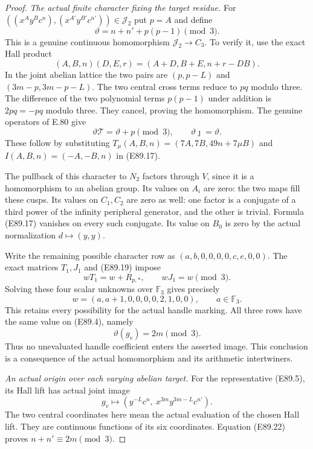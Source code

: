 \begin{proof}
\emph{The actual finite character fixing the target residue.}
For $((x^Ay^Bc^n),(x^{A'}y^{B'}c^{n'}))\in\mathcal J_2$
put $p=A$ and define
\[
          \vartheta=n+n'+p(p-1)\pmod3.
 \tag{E89.17}
\]
This is a genuine continuous homomorphism
$\mathcal J_2\to C_3$. To verify it, use
the exact Hall product
\[
  (A,B,n)(D,E,r)=(A+D,B+E,n+r-DB).
 \tag{E89.18}
\]
In the joint abelian lattice the two pairs
are $(p,p-L)$ and $(3m-p,3m-p-L)$.
The two central cross terms reduce to
$pq$ modulo three. The difference of the
two polynomial terms $p(p-1)$ under
addition is $2pq=-pq$ modulo three.
They cancel, proving the homomorphism.
The genuine operators of E.80 give
\[
    \vartheta\mathcal T=\vartheta+p\pmod3,
             \qquad\vartheta\jmath=\vartheta.
 \tag{E89.19}
\]
These follow by substituting
$T_\mu(A,B,n)=(7A,7B,49n+7\mu B)$
and $I(A,B,n)=(-A,-B,n)$ in (E89.17).

The pullback of this character to $N_2$
factors through $V$, since it is a homomorphism
to an abelian group. Its values on $A_i$
are zero: the two maps fill these cusps.
Its values on $C_1,C_2$ are zero as well:
one factor is a conjugate of a third power
of the infinity peripheral generator,
and the other is trivial. Formula (E89.17)
vanishes on every such conjugate. Its value
on $B_0$ is zero by the actual normalization
$d\mapsto(y,y)$.

Write the remaining possible character row as
$(a,b,0,0,0,0,c,e,0,0)$. The exact matrices
$T_1,J_1$ and (E89.19) impose
\[
 wT_1=w+R_{p,*},\qquad wJ_1=w\pmod3.
 \tag{E89.20}
\]
Solving these four scalar unknowns over
$\mathbb F_3$ gives precisely
\[
        w=(a,a+1,0,0,0,0,2,1,0,0),
                    \qquad a\in\mathbb F_3.
 \tag{E89.21}
\]
This retains every possibility for the actual
handle marking. All three rows have the same
value on (E89.4), namely
\[
                   \vartheta(g_v)=2m\pmod3.
 \tag{E89.22}
\]
Thus no unevaluated handle coefficient enters
the asserted image. This conclusion is a
consequence of the actual homomorphism and
its arithmetic intertwiners.

\emph{An actual origin over each varying abelian target.}
For the representative (E89.5), its Hall lift
has actual joint image
\[
       g_v\longmapsto
          (y^{-L}c^n,\ x^{3m}y^{3m-L}c^{n'}).
 \tag{E89.23}
\]
The two central coordinates here mean the
actual evaluation of the chosen Hall lift.
They are continuous functions of its six
coordinates. Equation (E89.22) proves
$n+n'\equiv2m\pmod3$.


\end{proof}
